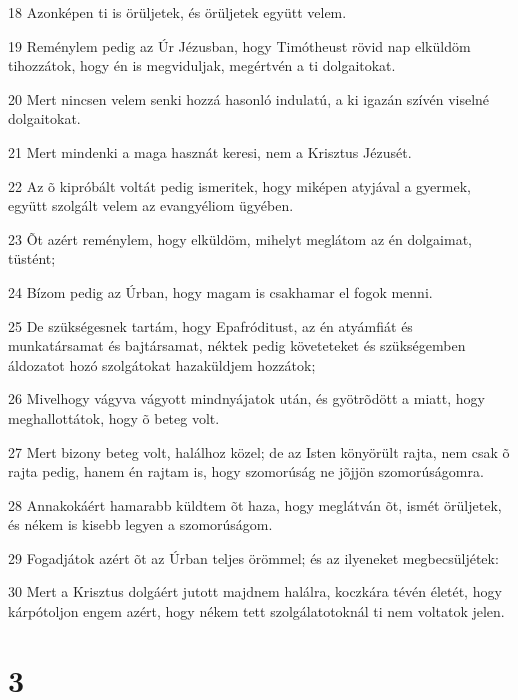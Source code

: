\par 18 Azonképen ti is örüljetek, és örüljetek együtt velem.
\par 19 Reménylem pedig az Úr Jézusban, hogy Timótheust rövid nap elküldöm tihozzátok, hogy én is megviduljak, megértvén a ti dolgaitokat.
\par 20 Mert nincsen velem senki hozzá hasonló indulatú, a ki igazán szívén viselné dolgaitokat.
\par 21 Mert mindenki a maga hasznát keresi, nem a Krisztus Jézusét.
\par 22 Az õ kipróbált voltát pedig ismeritek, hogy miképen atyjával a gyermek, együtt szolgált velem az evangyéliom ügyében.
\par 23 Õt azért reménylem, hogy elküldöm, mihelyt meglátom az én dolgaimat, tüstént;
\par 24 Bízom pedig az Úrban, hogy magam is csakhamar el fogok menni.
\par 25 De szükségesnek tartám, hogy Epafróditust, az én atyámfiát és munkatársamat és bajtársamat, néktek pedig követeteket és szükségemben áldozatot hozó szolgátokat hazaküldjem hozzátok;
\par 26 Mivelhogy vágyva vágyott mindnyájatok után, és gyötrõdött a miatt, hogy meghallottátok, hogy õ beteg volt.
\par 27 Mert bizony beteg volt, halálhoz közel; de az Isten könyörült rajta, nem csak õ rajta pedig, hanem én rajtam is, hogy szomorúság ne jõjjön szomorúságomra.
\par 28 Annakokáért hamarabb küldtem õt haza, hogy meglátván õt, ismét örüljetek, és nékem is kisebb legyen a szomorúságom.
\par 29 Fogadjátok azért õt az Úrban teljes örömmel; és az ilyeneket megbecsüljétek:
\par 30 Mert a Krisztus dolgáért jutott majdnem halálra, koczkára tévén életét, hogy kárpótoljon engem azért, hogy nékem tett szolgálatotoknál ti nem voltatok jelen.

\chapter{3}

